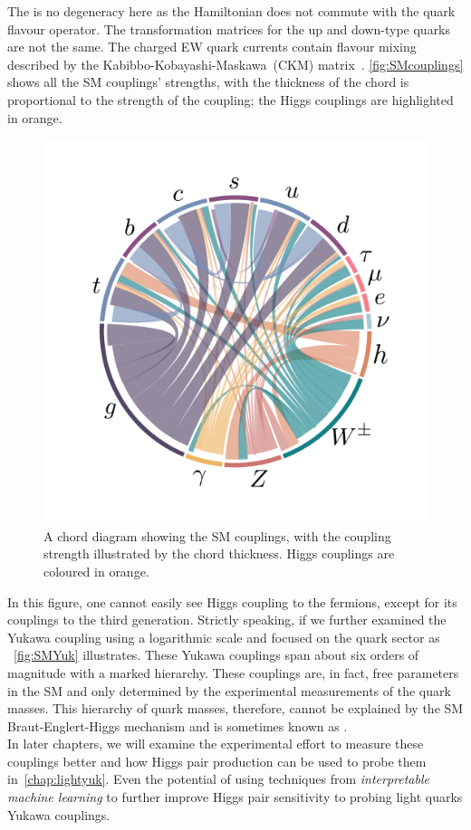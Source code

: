 The is no degeneracy here as the Hamiltonian does not commute with the quark flavour operator. The transformation matrices for the up and down-type quarks are not the same.  The charged EW quark currents contain flavour mixing described by the Kabibbo-Kobayashi-Maskawa~(CKM) matrix~\cite{PhysRevLett.10.531,10.1143/PTP.49.652}. 
\autoref{fig:SMcouplings} shows all the SM couplings' strengths, with the thickness of the chord is proportional to the strength of the coupling; the Higgs couplings are highlighted in orange. 
\begin{figure}[htpb!]
	\centering
	\includegraphics[width=\linewidth]{./figures/SM}
	\caption{A chord diagram showing the SM couplings, with the coupling strength illustrated by the chord thickness. Higgs couplings are coloured in orange.} \label{fig:SMcouplings}
\end{figure}
In this figure, one cannot easily see Higgs coupling to the fermions, except for its couplings to the third generation. Strictly speaking, if we further examined the Yukawa coupling using a logarithmic scale and focused on the quark sector as ~\autoref{fig:SMYuk} illustrates. These Yukawa couplings span about six orders of magnitude with a marked hierarchy. These couplings are, in fact, free parameters in the SM and only determined by the experimental measurements of the quark masses. This hierarchy of quark masses, therefore, cannot be explained by the SM Braut-Englert-Higgs mechanism and is sometimes known as .  \\ In later chapters, we will examine the experimental effort to measure these couplings better and how Higgs pair production can be used to probe them in~\autoref{chap:lightyuk}. Even the potential of using techniques from \emph{interpretable machine learning} to further improve Higgs pair sensitivity to probing light quarks Yukawa couplings.
